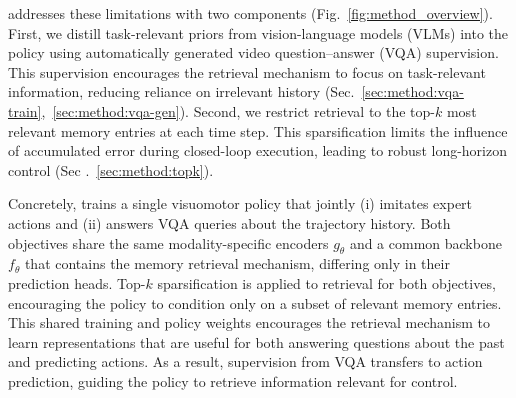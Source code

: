 \ourmethod{} addresses these limitations with two components (Fig.~\ref{fig:method_overview}).
First, we distill task-relevant priors from vision-language models (VLMs) into the policy using automatically generated video question--answer (VQA) supervision.
This supervision encourages the retrieval mechanism to focus on task-relevant information, reducing reliance on irrelevant history (Sec.~\ref{sec:method:vqa-train},~\ref{sec:method:vqa-gen}).
Second, we restrict retrieval to the top-$k$ most relevant memory entries at each time step.
This sparsification limits the influence of accumulated error during closed-loop execution, leading to robust long-horizon control (Sec .~\ref{sec:method:topk}).

% 

Concretely, \ourmethod{} trains a single visuomotor policy that jointly (i) imitates expert actions and (ii) answers VQA queries about the trajectory history.
Both objectives share the same modality-specific encoders $g_\theta$ and a common backbone $f_\theta$ that contains the memory retrieval mechanism, differing only in their prediction heads.
Top-$k$ sparsification is applied to retrieval for both objectives, encouraging the policy to condition only on a subset of relevant memory entries.
This shared training and policy weights encourages the retrieval mechanism to learn representations that are useful for both answering questions about the past and predicting actions.
As a result, supervision from VQA transfers to action prediction, guiding the policy to retrieve information relevant for control.

